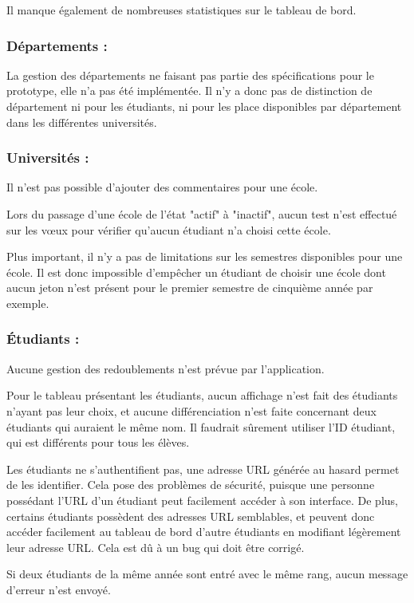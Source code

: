 Il manque également de nombreuses statistiques sur le tableau de bord.

\subsubsection{Départements :}
La gestion des départements ne faisant pas partie des spécifications pour le prototype, elle n'a pas été implémentée. Il n'y a donc pas de distinction de département ni pour les étudiants, ni pour les place disponibles par département dans les différentes universités.


\subsubsection{Universités :}
Il n'est pas possible d'ajouter des commentaires pour une école.

Lors du passage d'une école de l'état "actif" à "inactif", aucun test n'est effectué sur les vœux pour vérifier qu'aucun étudiant n'a choisi cette école.

Plus important, il n'y a pas de limitations sur les semestres disponibles pour une école. Il est donc impossible d'empêcher un étudiant de choisir une école dont aucun jeton n'est présent pour le premier semestre de cinquième année par exemple.


\subsubsection{Étudiants :}
Aucune gestion des redoublements n'est prévue par l'application.

Pour le tableau présentant les étudiants, aucun affichage n'est fait des étudiants n'ayant pas leur choix, et aucune différenciation n'est faite concernant deux étudiants qui auraient le même nom. Il faudrait sûrement utiliser l'ID étudiant, qui est différents pour tous les élèves.

Les étudiants ne s'authentifient pas, une adresse URL générée au hasard permet de les identifier. Cela pose des problèmes de sécurité, puisque une personne possédant l'URL d'un étudiant peut facilement accéder à son interface. De plus, certains étudiants possèdent des adresses URL semblables, et peuvent donc accéder facilement au tableau de bord d'autre étudiants en modifiant légèrement leur adresse URL. Cela est dû à un bug qui doit être corrigé.

Si deux étudiants de la même année sont entré avec le même rang, aucun message d'erreur n'est envoyé.


